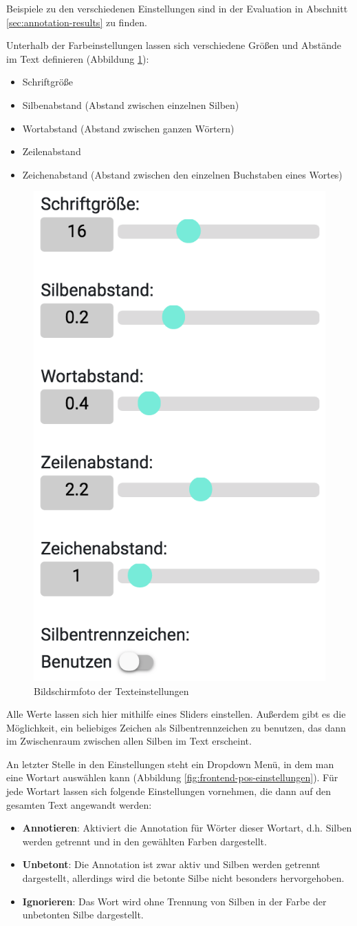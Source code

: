 Beispiele zu den verschiedenen Einstellungen sind in der Evaluation in Abschnitt \ref{sec:annotation-results} zu finden.

Unterhalb der Farbeinstellungen lassen sich verschiedene Größen und Abstände im Text definieren (Abbildung \ref{fig:frontend-textconf}):
\begin{itemize}
	\item Schriftgröße
	\item Silbenabstand (Abstand zwischen einzelnen Silben)
	\item Wortabstand (Abstand zwischen ganzen Wörtern)
	\item Zeilenabstand
	\item Zeichenabstand (Abstand zwischen den einzelnen Buchstaben eines Wortes)
\end{itemize}

\begin{figure}[h!]
	\centering
	\includegraphics[width=.4\linewidth, frame]{figures/frontend/config-text}
	\caption{Bildschirmfoto der Texteinstellungen}
	\label{fig:frontend-textconf}
\end{figure}

Alle Werte lassen sich hier mithilfe eines Sliders einstellen. Außerdem gibt es die Möglichkeit, ein beliebiges Zeichen als Silbentrennzeichen zu benutzen, das dann im Zwischenraum zwischen allen Silben im Text erscheint.

An letzter Stelle in den Einstellungen steht ein Dropdown Menü, in dem man eine Wortart auswählen kann (Abbildung \ref{fig:frontend-pos-einstellungen}). Für jede Wortart lassen sich folgende Einstellungen vornehmen, die dann auf den gesamten Text angewandt werden:
\begin{itemize}
	\item \textbf{Annotieren}: Aktiviert die Annotation für Wörter dieser Wortart, d.h. Silben werden getrennt und in den gewählten Farben dargestellt.
	
	\item \textbf{Unbetont}: Die Annotation ist zwar aktiv und Silben werden getrennt dargestellt, allerdings wird die betonte Silbe nicht besonders hervorgehoben.
	
	\item \textbf{Ignorieren}: Das Wort wird ohne Trennung von Silben in der Farbe der unbetonten Silbe dargestellt.
\end{itemize}

